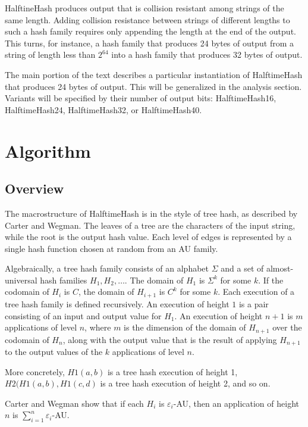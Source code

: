 \documentclass[sigconf, nonacm]{acmart}
\begin{document}
HalftineHash produces output that is collision resistant among strings of the same length.
Adding collision resistance between strings of different lengths to such a hash family requires only appending the length at the end of the output.
This turns, for instance, a hash family that produces 24 bytes of output from a string of length less than $2^64$ into a hash family that produces 32 bytes of output.

The main portion of the text describes a particular instantiation of HalftimeHash that produces 24 bytes of output.
This will be generalized in the analysis section.
Variants will be specified by their number of output bits: HalftimeHash16, HalftimeHash24, HalftimeHash32, or HalftimeHash40.

\section{Algorithm}
\label{algo}

\subsection{Overview}

The macrostructure of HalftimeHash is in the style of tree hash, as described by Carter and Wegman. \cite{carter-wegman-79}
The leaves of a tree are the characters of the input string, while the root is the output hash value.
Each level of edges is represented by a single hash function chosen at random from an AU family.

Algebraically, a tree hash family consists of an alphabet $\Sigma$ and a set of almost-universal hash families $H_1, H_2, \dots$.
The domain of $H_1$ is $\Sigma^k$ for some $k$.
If the codomain of $H_i$ is $C$, the domain of $H_{i+1}$ is $C^k$ for some $k$.
Each execution of a tree hash family is defined recursively.
An execution of height $1$ is a pair consisting of an input and output value for $H_1$.
An execution of height $n+1$ is $m$ applications of level $n$, where $m$ is the dimension of the domain of $H_{n+1}$ over the codomain of $H_n$, along with the output value that is the result of applying $H_{n+1}$ to the output values of the $k$ applications of level $n$.

More concretely, $H1(a,b)$ is a tree hash execution of height 1, $H2(H1(a,b), H1(c,d)$ is a tree hash execution of height 2, and so on.

Carter and Wegman show that if each $H_i$ is $\varepsilon_i$-AU, then an application of height $n$ is $\sum_{i=1}^n \varepsilon_i$-AU.
\end{document}
